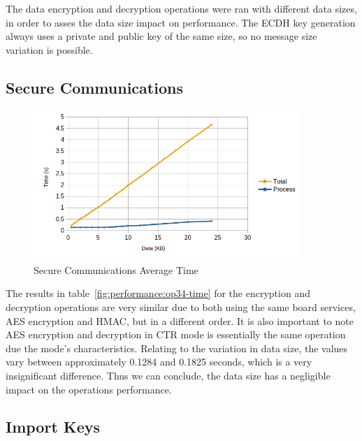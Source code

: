 The data encryption and decryption operations were ran with different data sizes, in order to asses the data size impact on performance.
The ECDH key generation always uses a private and public key of the same size, so no message size variation is possible.

\subsection{Secure Communications}\label{chap:evaluation:services:comms}

\begin{figure}[h!]
	\centering
	\includegraphics[width=0.9\textwidth]{./Images/encrypt-time.png}
	\caption{Secure Communications Average Time}
	\label{fig:performance:encrypt-time}
\end{figure}

The results in table~\ref{fig:performance:op34-time} for the encryption and decryption operations are very similar due to both using the same board services, AES encryption and HMAC, but in a different order. It is also important to note AES encryption and decryption in CTR mode is essentially the same operation due the mode's characteristics.
Relating to the variation in data size, the values vary between approximately 0.1284 and 0.1825 seconds, which is a very insignificant difference. Thus we can conclude, the data size has a negligible impact on the operations performance.

\subsection{Import Keys}\label{chap:evaluation:services:import-key}

